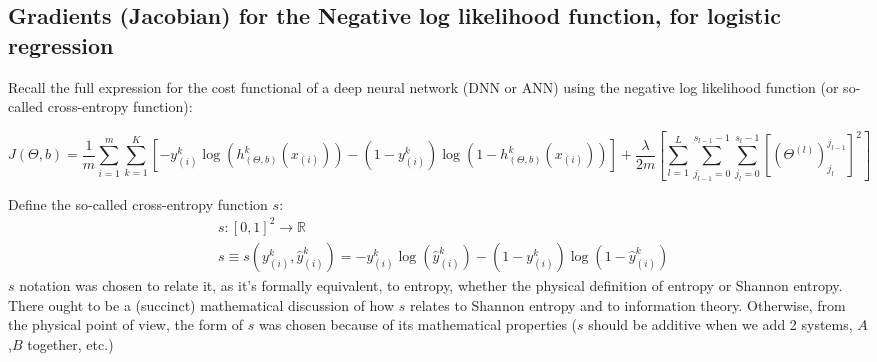 \documentclass[10pt]{amsart}
\begin{document}
\begin{multicols*}{2}
\subsection{Gradients (Jacobian) for the Negative log likelihood function, for logistic regression}

Recall the full expression for the cost functional of a deep neural network (DNN or ANN) using the negative log likelihood function (or so-called cross-entropy function):  

\begin{equation}
J(\Theta,b) = \frac{1}{m} \sum_{i=1}^m \sum_{k=1}^K \left[ -y^k_{(i)} \log{ (h^k_{(\Theta,b)}(x_{(i)}) )} - (1-y^k_{(i)}) \log{ (1-h^k_{(\Theta,b)}(x_{(i)}) )}  \right] +  \frac{\lambda}{2m} \left[ \sum_{l=1}^L \sum_{j_{l-1} =0}^{ s_{l-1} -1} \sum_{j_l =0}^{s_l - 1} \left[ ( \Theta^{ (l)} )_{j_l}^{j_{l-1}} \right]^2 \right]
\end{equation}

Define the so-called cross-entropy function $s$:
\[
\begin{aligned}
& s:[0,1]^2 \to \mathbb{R} \\ 
& s\equiv s( y^k_{(i)}, \widehat{y}_{(i)}^k ) = -y^k_{(i)} \log{ (\widehat{y}^k_{(i)})} - (1-y^k_{(i)}) \log{ (1-\widehat{y}^k_{(i)})}  
\end{aligned}
\]
$s$ notation was chosen to relate it, as it's formally equivalent, to entropy, whether the physical definition of entropy or Shannon entropy.  There ought to be a (succinct) mathematical discussion of how $s$ relates to Shannon entropy and to information theory.  Otherwise, from the physical point of view, the form of $s$ was chosen because of its mathematical properties ($s$ should be additive when we add 2 systems, $A$,$B$ together, etc.)


\end{multicols*}
\end{document}
